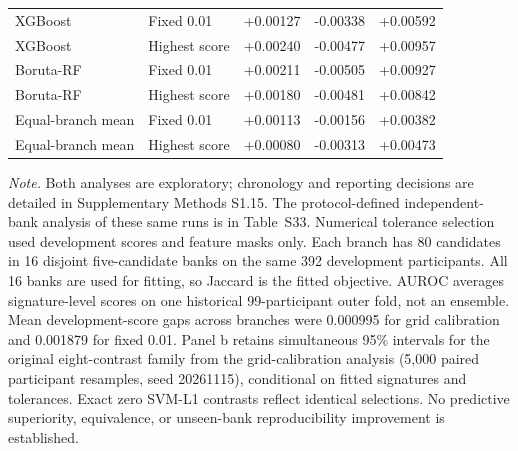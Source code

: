 \begin{table}[p]
\begin{tabular}{llrrr}
XGBoost & Fixed 0.01 & +0.00127 & -0.00338 & +0.00592 \\
XGBoost & Highest score & +0.00240 & -0.00477 & +0.00957 \\
Boruta-RF & Fixed 0.01 & +0.00211 & -0.00505 & +0.00927 \\
Boruta-RF & Highest score & +0.00180 & -0.00481 & +0.00842 \\
Equal-branch mean & Fixed 0.01 & +0.00113 & -0.00156 & +0.00382 \\
Equal-branch mean & Highest score & +0.00080 & -0.00313 & +0.00473 \\
\bottomrule
\end{tabular}
\par\medskip
\parbox{0.98\linewidth}{\footnotesize
\textit{Note.} Both analyses are exploratory; chronology and reporting decisions are detailed in Supplementary Methods S1.15. The protocol-defined independent-bank analysis of these same runs is in Table~S33. Numerical tolerance selection used development scores and feature masks only. Each branch has 80 candidates in 16 disjoint five-candidate banks on the same 392 development participants. All 16 banks are used for fitting, so Jaccard is the fitted objective. AUROC averages signature-level scores on one historical 99-participant outer fold, not an ensemble. Mean development-score gaps across branches were 0.000995 for grid calibration and 0.001879 for fixed 0.01. Panel b retains simultaneous 95\% intervals for the original eight-contrast family from the grid-calibration analysis (5,000 paired participant resamples, seed 20261115), conditional on fitted signatures and tolerances. Exact zero SVM-L1 contrasts reflect identical selections. No predictive superiority, equivalence, or unseen-bank reproducibility improvement is established.}
\end{table}

